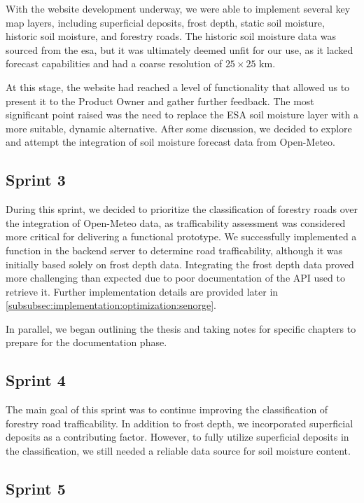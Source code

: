 With the website development underway, we were able to implement several key map layers, including superficial deposits, frost depth, static soil moisture, historic soil moisture, and forestry roads. The historic soil moisture data was sourced from the \acrshort{esa}, but it was ultimately deemed unfit for our use, as it lacked forecast capabilities and had a coarse resolution of $25 \times 25\text{ km}$.

At this stage, the website had reached a level of functionality that allowed us to present it to the Product Owner and gather further feedback. The most significant point raised was the need to replace the ESA soil moisture layer with a more suitable, dynamic alternative. After some discussion, we decided to explore and attempt the integration of soil moisture forecast data from Open-Meteo.

\subsection{Sprint 3}

During this sprint, we decided to prioritize the classification of forestry roads over the integration of Open-Meteo data, as trafficability assessment was considered more critical for delivering a functional prototype. We successfully implemented a function in the backend server to determine road trafficability, although it was initially based solely on frost depth data. Integrating the frost depth data proved more challenging than expected due to poor documentation of the API used to retrieve it. Further implementation details are provided later in \autoref{subsubsec:implementation:optimization:senorge}.

In parallel, we began outlining the thesis and taking notes for specific chapters to prepare for the documentation phase.

\subsection{Sprint 4}

The main goal of this sprint was to continue improving the classification of forestry road trafficability. In addition to frost depth, we incorporated superficial deposits as a contributing factor. However, to fully utilize superficial deposits in the classification, we still needed a reliable data source for soil moisture content.

\subsection{Sprint 5}

